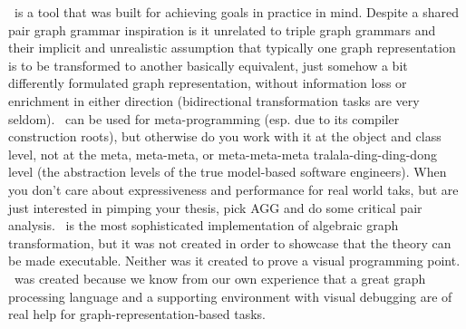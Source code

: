 \GrG\ is a tool that was built for achieving goals in practice in mind.
Despite a shared pair graph grammar inspiration is it unrelated to triple graph grammars and their implicit and unrealistic assumption that typically one graph representation is to be transformed to another basically equivalent, just somehow a bit differently formulated graph representation, without information loss or enrichment in either direction (bidirectional transformation tasks are very seldom).
\GrG\ can be used for meta-programming (esp. due to its compiler construction roots), but otherwise do you work with it at the object and class level, not at the meta, meta-meta, or meta-meta-meta tralala-ding-ding-dong level (the abstraction levels of the true model-based software engineers).
When you don't care about expressiveness and performance for real world taks, but are just interested in pimping your thesis, pick AGG and do some critical pair analysis.
\GrG\ is the most sophisticated implementation of algebraic graph transformation, but it was not created in order to showcase that the theory can be made executable.
Neither was it created to prove a visual programming point.
\GrG\ was created because we know from our own experience that a great graph processing language and a supporting environment with visual debugging are of real help for graph-representation-based tasks.

